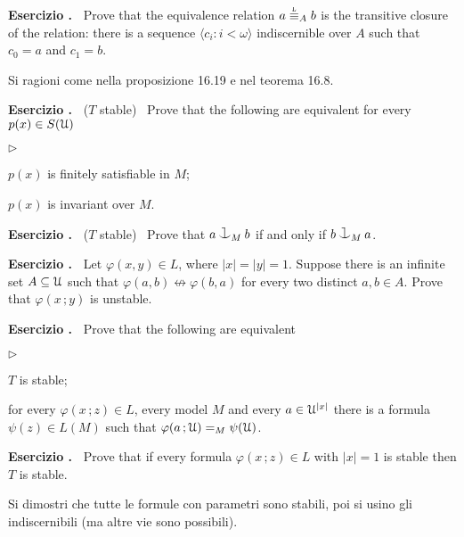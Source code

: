 \documentclass[10pt]{article}
\def\U{\EuScript U}
\def\niff{\nleftrightarrow}
\def\<{\langle}
\def\>{\rangle}
\def\cnonfork{\mathbin{\raise1.8ex\rlap{\kern0.6ex\rule{0.6ex}{0.1ex}}\rlap{\kern1.1ex\rule{0.1ex}{1.9ex}}\raise-0.3ex\hbox{$\smile$} } }
\newcommand{\labella}[1]{{\sf\footnotesize #1}\hfill}
\renewenvironment{itemize}
  {\begin{list}{$\triangleright$}{%
   \setlength{\parskip}{0mm}
   \setlength{\topsep}{0mm}
   \setlength{\rightmargin}{0mm}
   \setlength{\listparindent}{0mm}
   \setlength{\itemindent}{0mm}
   \setlength{\labelwidth}{3ex}
   \setlength{\itemsep}{0mm}
   \setlength{\parsep}{0mm}
   \setlength{\partopsep}{0mm}
   \setlength{\labelsep}{1ex}
   \setlength{\leftmargin}{\labelwidth+\labelsep}
   \let\makelabel\labella}}{%
  \end{list}}
\newcounter{ex}
\newenvironment{exercise}{\bigskip\addtocounter{ex}{1}\textbf{Esercizio \theex.\ }}{}
\begin{document}
\begin{exercise}
  Prove that the equivalence relation $a\stackrel{\smash{\scalebox{.5}{\rm L}}}{\equiv}_Ab$ is the transitive closure of the relation: there is a sequence $\<c_i:i<\omega\>$ indiscernible over $A$ such that $c_0=a$ and $c_1=b$.

  Si ragioni come nella proposizione 16.19 e nel teorema 16.8.
\end{exercise}


\begin{exercise}
  ($T$ stable) \  Prove that the following are equivalent for every $p(x)\in S(\U)$
  \begin{itemize}
    \item[1.] $p(x)$ is finitely satisfiable in $M$;
    \item[2.] $p(x)$ is invariant over $M$.
  \end{itemize}
\end{exercise}


\begin{exercise}
  ($T$ stable) \ 
  Prove that $a\cnonfork_M b$ if and only if $b\cnonfork_M a$.
\end{exercise}

\hfill\hrulefill\hfill\hfill

\begin{exercise}
  Let $\varphi(x,y)\in  L$, where $|x|=|y|=1$.
  Suppose there is an infinite set $A\subseteq\U$ such that $\varphi(a,b)\niff\varphi(b,a)$ for every two distinct $a,b\in A$.
  Prove that $\varphi(x\,;y)$ is unstable.
\end{exercise}

\begin{exercise}
  Prove that the following are equivalent
  \begin{itemize}
    \item[1.] $T$ is stable;
    \item[2.] for every $\varphi(x\,;z)\in L$, every model $M$ and every $a\in\U^{|x|}$ there is a formula $\psi(z)\in L(M)$ such that $\varphi(a\,;\U)=_M\psi(\U)$.
  \end{itemize} 
\end{exercise}

\begin{exercise}
  Prove that if every formula $\varphi(x\,;z)\in L$ with $|x|=1$ is stable then $T$ is stable. 
  
  Si dimostri che tutte le formule con parametri sono stabili, poi si usino gli indiscernibili (ma altre vie sono possibili). 
\end{exercise}
\end{document}
